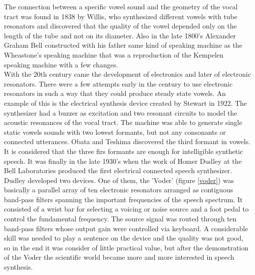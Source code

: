 The connection between a specific vowel sound and the geometry of the vocal tract was found in 1838 by Willis, who synthesized different vowels with tube resonators and discovered that the quality of the vowel depended only on the length of the tube and not on its diameter.
Also in the late 1800's Alexander Graham Bell constructed with his father same kind of speaking machine as the Wheastone's speaking machine that was a reproduction of the Kempelen speaking machine with a few changes.\\
With the 20th century came the development of electronics and later of electronic resonators. There were a few attempts early in the century to use electronic resonators in such a way that they could produce steady state vowels. An example of this is the electrical synthesis device created by Stewart in 1922. The synthesizer had a buzzer as excitation and two resonant circuits to model the acoustic resonances of the vocal tract. The machine was able to generate single static vowels sounds with two lowest formants, but not any consonants or connected utterances. Obata and Teshima discovered the third formant in vowels. It is considered that the three firs formants are enough for intelligible synthetic speech. It was finally in the late 1930's when the work of Homer Dudley at the Bell Laboratories produced the first electrical connected speech synthesizer.\\
Dudley developed two devices. One of them, the 'Voder' (figure \ref{voder}) was basically a parallel array of ten electronic resonators arranged as contiguous band-pass filters spanning  the important frequencies of the speech spectrum. It consisted of a wrist bar for selecting a voicing or noise source and a foot pedal to control the fundamental frequency. The source signal was routed through ten band-pass filters whose output gain were controlled via keyboard. A considerable skill was needed to play a sentence on the device and the quality was not good, so in the end it was consider of little practical value, but after the demonstration of the Voder the scientific world became more and more interested in speech synthesis.\\
